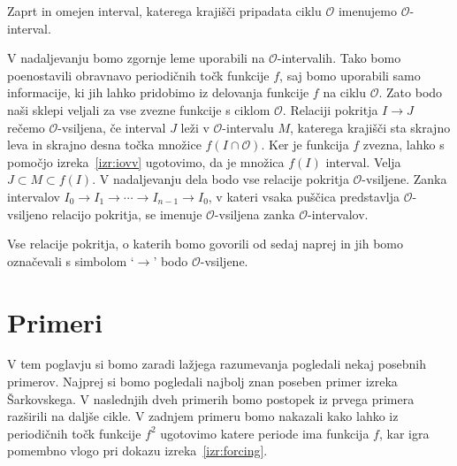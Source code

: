 \documentclass[mat2]{fmfdelo}
\begin{document}
\begin{definicija}
Zaprt in omejen interval, katerega krajišči pripadata ciklu $\mathcal{O}$ imenujemo $\mathcal{O}$-interval. 
\end{definicija}
V nadaljevanju bomo zgornje leme uporabili na $\mathcal{O}$-intervalih. Tako bomo poenostavili obravnavo periodičnih točk funkcije $f$, saj bomo uporabili samo informacije, ki jih lahko pridobimo iz delovanja funkcije $f$ na ciklu $\mathcal{O}$. Zato bodo naši sklepi veljali za vse zvezne funkcije s ciklom $\mathcal{O}$. Relaciji pokritja $I \to J$ rečemo $\mathcal{O}$-vsiljena, če interval $J$ leži v $\mathcal{O}$-intervalu $M$, katerega krajišči sta skrajno leva in skrajno desna točka množice $f(I \cap \mathcal{O})$. Ker je funkcija $f$ zvezna, lahko s pomočjo izreka~\ref{izr:iovv} ugotovimo, da je množica $f(I)$ interval. Velja $J \subset M \subset f(I)$. V nadaljevanju dela bodo vse relacije pokritja $\mathcal{O}$-vsiljene. Zanka intervalov $I_0 \to I_1 \to \cdots \to I_{n-1} \to I_0$, v kateri vsaka puščica predstavlja $\mathcal{O}$-vsiljeno relacijo pokritja, se imenuje $\mathcal{O}$-vsiljena zanka $\mathcal{O}$-intervalov.


Vse relacije pokritja, o katerih bomo govorili od sedaj naprej in jih bomo označevali s simbolom `$\to$' bodo $\mathcal{O}$-vsiljene.

\section{Primeri}%
V tem poglavju si bomo zaradi lažjega razumevanja pogledali nekaj posebnih primerov. Najprej si bomo pogledali najbolj znan poseben primer izreka Šarkovskega. V naslednjih dveh primerih bomo postopek iz prvega primera razširili na daljše cikle. V zadnjem primeru bomo nakazali kako lahko iz periodičnih točk funkcije $f^2$ ugotovimo katere periode ima funkcija $f$, kar igra pomembno vlogo pri dokazu izreka~\ref{izr:forcing}.
\end{document}
